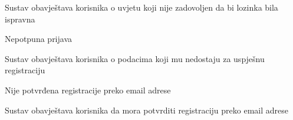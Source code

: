 \begin{packed_item}
\begin{packed_item}
\begin{packed_enum}
								\item Sustav obavještava korisnika o uvjetu koji nije zadovoljen da bi lozinka bila ispravna
								
								\end{packed_enum}
							
							\item[3.c] Nepotpuna prijava \begin{packed_enum}
								
								\item Sustav obavještava korisnika o podacima koji mu nedostaju za uspješnu registraciju
								
								\end{packed_enum}
							
							\item[5.a] Nije potvrđena registracije preko email adrese \begin{packed_enum}
								
								\item Sustav obavještava korisnika da mora potvrditi registraciju preko email adrese
								
							\end{packed_enum}
							
						\end{packed_item}
						
					\end{packed_item}
					
